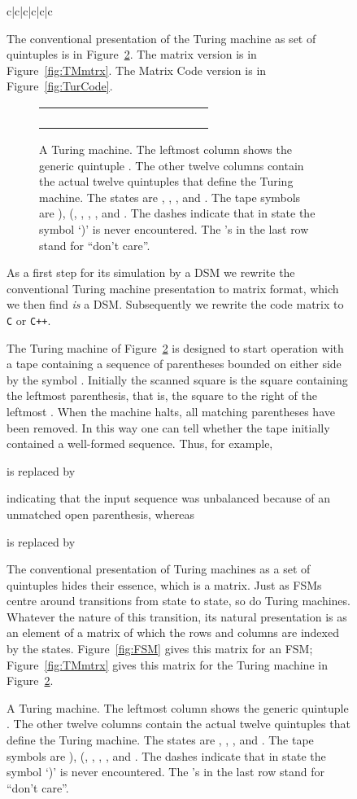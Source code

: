 \documentclass[preprint,11pt]{elsarticle}
\begin{document}
\begin{figure}[htbp]
\begin{center}
\begin{minipage}{4in}
\begin{tabular}{c|c|c|c|c|c}
{The conventional presentation of the Turing machine
as set of quintuples
is in Figure~\ref{fig:TM}.
The matrix version is in Figure~\ref{fig:TMmtrx}.
The Matrix Code version is in Figure~\ref{fig:TurCode}.
\begin{figure}[htbp]
\begin{center}
\begin{minipage}{4.5in}
\begin{tabular}{l||l|l|l|l|l|l|l|l|l|l|l|l|}
 &&&&&&&&&&&&\\
\hline
 &&&&&&&&&&&&\\
\hline
 &&&&&&&&&&&& \\
\hline
 &&&&&&&&&&&&\\
\hline
 &&&&&&&&&&&&
\end{tabular}
\end{minipage}
\end{center}
\caption{\label{fig:TM}
A Turing machine.
The leftmost column shows the generic quintuple
.
The other twelve columns contain the actual twelve
quintuples that define the Turing machine.
The states are
, , , and .
The tape symbols are ), (, , , , and .
The dashes indicate that in state  the symbol `)'
is never encountered.
The 's in the last row stand for ``don't care''.
}
\end{figure}
As a first step for its simulation by a DSM
we rewrite the conventional Turing machine presentation
to matrix format, which we then find \emph{is} a DSM.
Subsequently we rewrite the code matrix to {\tt C} or {\tt C++}.

\vspace{3mm}

The Turing machine of Figure~\ref{fig:TM}
is designed to start operation with
a tape containing a sequence of parentheses bounded on either
side by the symbol .
Initially the scanned square is
the square containing the leftmost parenthesis,
that is, the square to the right of the leftmost .
When the machine halts,
all matching parentheses have been removed.
In this way one can tell whether the tape initially contained
a well-formed sequence.
Thus, for example,

is replaced by

indicating that the input sequence was unbalanced because
of an unmatched open parenthesis, whereas

is replaced by


The conventional presentation of Turing machines
as a set of quintuples hides their essence,
which is a matrix.
Just as FSMs centre around transitions from state to state,
so do Turing machines.
Whatever the nature of this transition,
its natural presentation is as an element of a matrix
of which the rows and columns are indexed by the states.
Figure~\ref{fig:FSM} gives this matrix for an FSM;
Figure~\ref{fig:TMmtrx} gives this matrix for the Turing
machine in Figure~\ref{fig:TM}.

}
\end{tabular}
\end{minipage}
\end{center}
\end{figure}
\end{document}
